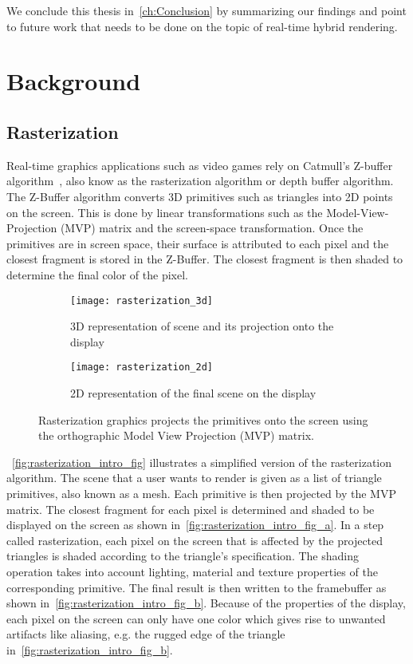 We conclude this thesis in~\autoref{ch:Conclusion} by summarizing our findings and point to future work that needs to be done on the topic of real-time hybrid rendering.


\chapter{Background}
\label{sec:Background}

\section{Rasterization}
\label{sec:rasterization_intro}

Real-time graphics applications such as video games rely on Catmull's Z-buffer algorithm~\cite{10.5555/907242}, also know as the rasterization algorithm or depth buffer algorithm. The Z-Buffer algorithm converts 3D primitives such as triangles into 2D points on the screen. This is done by linear transformations such as the Model-View-Projection (MVP) matrix and the screen-space transformation.
Once the primitives are in screen space, their surface is attributed to each pixel and the closest fragment is stored in the Z-Buffer. The closest fragment is then shaded to determine the final color of the pixel. 

\begin{figure}
\centering
\begin{subfigure}[t]{.45\textwidth}
  \centering
  \texttt{[image: rasterization\_3d]}
  \caption{3D representation of scene and its projection onto the display} 
  \label{fig:rasterization_intro_fig_a}
\end{subfigure}%
 \hfill
\begin{subfigure}[t]{.45\textwidth}
  \centering
  \texttt{[image: rasterization\_2d]}
  \caption{2D representation of the final scene on the display}
  \label{fig:rasterization_intro_fig_b}
\end{subfigure}
\caption{\label{fig:rasterization_intro_fig}
           Rasterization graphics projects the primitives onto the screen using the orthographic Model View Projection (MVP) matrix. }
\end{figure}

~\autoref{fig:rasterization_intro_fig} illustrates a simplified version of the rasterization algorithm. The scene that a user wants to render is given as a list of triangle primitives, also known as a mesh. Each primitive is then projected by the MVP matrix. The closest fragment for each pixel is determined and shaded to be displayed on the screen as shown in~\autoref{fig:rasterization_intro_fig_a}. In a step called rasterization, each pixel on the screen that is affected by the projected triangles is shaded according to the triangle's specification. The shading operation takes into account lighting, material and texture properties of the corresponding primitive. The final result is then written to the framebuffer as shown in~\autoref{fig:rasterization_intro_fig_b}. Because of the properties of the display, each pixel on the screen can only have one color which gives rise to unwanted artifacts like aliasing, e.g. the rugged edge of the triangle in~\autoref{fig:rasterization_intro_fig_b}.

